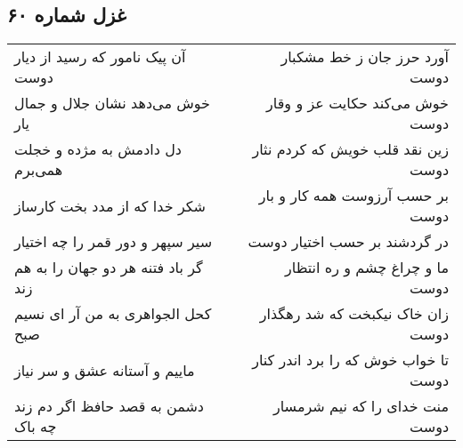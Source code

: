 \begin{center}
\section*{غزل شماره ۶۰}
\label{sec:sh060}
\begin{longtable}{l p{0.5cm} r}
آن پیک نامور که رسید از دیار دوست
&&
آورد حرز جان ز خط مشکبار دوست
\\
خوش می‌دهد نشان جلال و جمال یار
&&
خوش می‌کند حکایت عز و وقار دوست
\\
دل دادمش به مژده و خجلت همی‌برم
&&
زین نقد قلب خویش که کردم نثار دوست
\\
شکر خدا که از مدد بخت کارساز
&&
بر حسب آرزوست همه کار و بار دوست
\\
سیر سپهر و دور قمر را چه اختیار
&&
در گردشند بر حسب اختیار دوست
\\
گر باد فتنه هر دو جهان را به هم زند
&&
ما و چراغ چشم و ره انتظار دوست
\\
کحل الجواهری به من آر ای نسیم صبح
&&
زان خاک نیکبخت که شد رهگذار دوست
\\
ماییم و آستانه عشق و سر نیاز
&&
تا خواب خوش که را برد اندر کنار دوست
\\
دشمن به قصد حافظ اگر دم زند چه باک
&&
منت خدای را که نیم شرمسار دوست
\\
\end{longtable}
\end{center}
